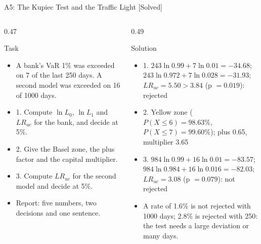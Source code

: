 \begin{frame}{A5: The Kupiec Test and the Traffic Light [Solved]}
\itemsize{\scriptsize}
\begin{columns}[T]
\begin{column}{0.47\textwidth}
\begin{block}{Task}
\begin{itemize}
    \item A bank's VaR 1\% was exceeded on 7 of the last 250 days. A second model was exceeded on 16 of 1000 days.
    \item 1. Compute $\ln L_0$, $\ln L_1$ and $LR_{uc}$ for the bank, and decide at 5\%.
    \item 2. Give the Basel zone, the plus factor and the capital multiplier.
    \item 3. Compute $LR_{uc}$ for the second model and decide at 5\%.
    \item Report: five numbers, two decisions and one sentence.
\end{itemize}
\end{block}
\end{column}
\begin{column}{0.49\textwidth}
\begin{exampleblock}{Solution}
\begin{itemize}
    \item 1. $243\ln 0.99 + 7\ln 0.01 = -34.68$; $243\ln 0.972 + 7\ln 0.028 = -31.93$; $LR_{uc} = 5.50 > 3.84$ (p $= 0.019$): rejected
    \item 2. Yellow zone ($P(X \le 6) = 98.63\%$, $P(X \le 7) = 99.60\%$); plus 0.65, multiplier 3.65
    \item 3. $984\ln 0.99 + 16\ln 0.01 = -83.57$; $984\ln 0.984 + 16\ln 0.016 = -82.03$; $LR_{uc} = 3.08$ (p $= 0.079$): not rejected
    \item A rate of 1.6\% is not rejected with 1000 days; 2.8\% is rejected with 250: the test needs a large deviation or many days.
\end{itemize}
\end{exampleblock}
\end{column}
\end{columns}
\end{frame}

